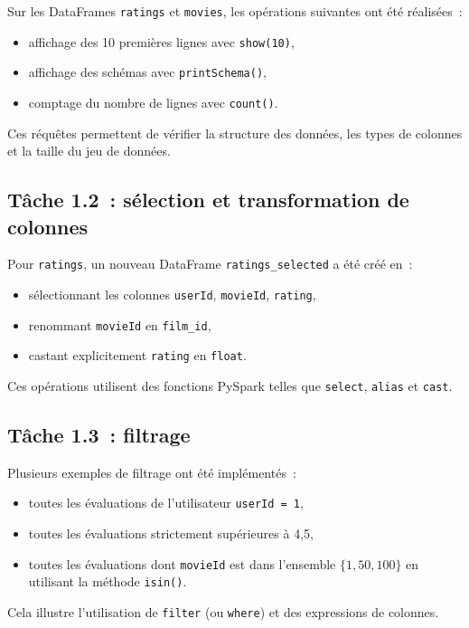 \documentclass[a4paper,11pt]{article}
\begin{document}
Sur les DataFrames \texttt{ratings} et \texttt{movies},
les opérations suivantes ont été réalisées~:
\begin{itemize}
  \item affichage des 10 premières lignes avec \texttt{show(10)},
  \item affichage des schémas avec \texttt{printSchema()},
  \item comptage du nombre de lignes avec \texttt{count()}.
\end{itemize}

Ces réquêtes permettent de vérifier la structure des données, les types de
colonnes et la taille du jeu de données.

\subsection{Tâche 1.2~: sélection et transformation de colonnes}

Pour \texttt{ratings}, un nouveau DataFrame \texttt{ratings\_selected}
a été créé en~:
\begin{itemize}
  \item sélectionnant les colonnes \texttt{userId}, \texttt{movieId},
        \texttt{rating},
  \item renommant \texttt{movieId} en \texttt{film\_id},
  \item castant explicitement \texttt{rating} en \texttt{float}.
\end{itemize}

Ces opérations utilisent des fonctions PySpark telles que
\texttt{select}, \texttt{alias} et \texttt{cast}.

\subsection{Tâche 1.3~: filtrage}

Plusieurs exemples de filtrage ont été implémentés~:
\begin{itemize}
  \item toutes les évaluations de l'utilisateur \texttt{userId = 1},
  \item toutes les évaluations strictement supérieures à 4{,}5,
  \item toutes les évaluations dont \texttt{movieId} est dans l'ensemble
        $\{1, 50, 100\}$ en utilisant la méthode \texttt{isin()}.
\end{itemize}

Cela illustre l'utilisation de \texttt{filter} (ou \texttt{where})
et des expressions de colonnes.
\end{document}
